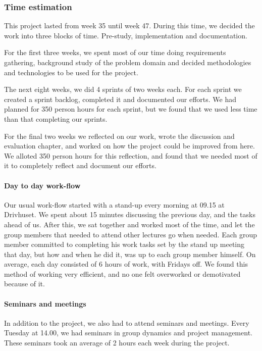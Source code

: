 	\subsubsection{Time estimation}
  This project lasted from week 35 until week 47. During this time, we decided
  the work into three blocks of time. Pre-study, implementation and
  documentation. 
  
  For the first three weeks, we spent most of our time doing
  requirements gathering, background study of the problem domain and decided
  methodologies and technologies to be used for the project.

  The next eight weeks, we did 4 sprints of two weeks each. For each sprint we
  created a sprint backlog, completed it and documented our efforts. We had
  planned for 350 person hours for each sprint, but we found that we used less
  time than that completing our sprints. 

  For the final two weeks we reflected on our work, wrote the discussion and
  evaluation chapter, and worked on how the project could be improved from here.
  We alloted 350 person hours for this reflection, and found that we needed most
  of it to completely reflect and document our efforts. 
  
  \paragraph{Day to day work-flow}
  Our usual work-flow started with a stand-up every morning at 09.15 at Drivhuset.
  We spent about 15 minutes discussing the previous day, and the tasks ahead of
  us. After this, we sat together and worked most of the time, and let the group
  members that needed to attend other lectures go when needed. Each group member
  committed to completing his work tasks set by the stand up meeting that day,
  but how and when he did it, was up to each group member himself. On average,
  each day consisted of 6 hours of work, with Fridays off. We found this method
  of working very efficient, and no one felt overworked or demotivated because
  of it.

  \paragraph{Seminars and meetings}
  In addition to the project, we also had to attend seminars and meetings. Every
  Tuesday at 14.00, we had seminars in group dynamics and project management.
  These seminars took an average of 2 hours each week during the project. 

